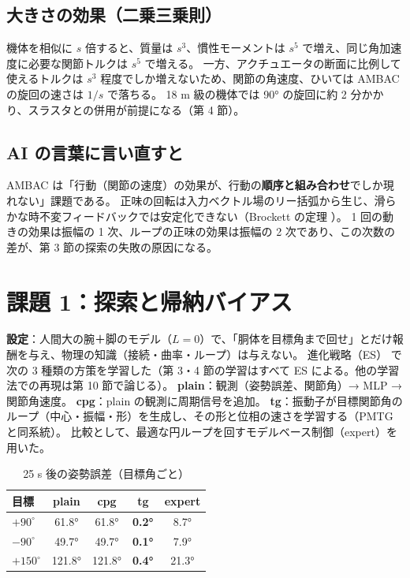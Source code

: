 \documentclass[paper=a4paper,fontsize=10pt,twocolumn,column_gap=2zw,line_length=24zw,number_of_lines=46,head_space=20mm]{jlreq}
\begin{document}
\subsection{大きさの効果（二乗三乗則）}
機体を相似に $s$ 倍すると、質量は $s^3$、慣性モーメントは $s^5$ で増え、同じ角加速度に必要な関節トルクは $s^5$ で増える。
一方、アクチュエータの断面に比例して使えるトルクは $s^3$ 程度でしか増えないため、関節の角速度、ひいては AMBAC の旋回の速さは $1/s$ で落ちる。
18 m 級の機体では 90° の旋回に約 2 分かかり、スラスタとの併用が前提になる（第 4 節）。

\subsection{AI の言葉に言い直すと}
AMBAC は「行動（関節の速度）の効果が、行動の\textbf{順序と組み合わせ}でしか現れない」課題である。
正味の回転は入力ベクトル場のリー括弧から生じ、滑らかな時不変フィードバックでは安定化できない（Brockett の定理 \cite{brockett1983}）。
1 回の動きの効果は振幅の 1 次、ループの正味の効果は振幅の 2 次であり、この次数の差が、第 3 節の探索の失敗の原因になる。


\section{課題 1：探索と帰納バイアス}

\textbf{設定}：人間大の腕＋脚のモデル（$L=0$）で、「胴体を目標角まで回せ」とだけ報酬を与え、物理の知識（接続・曲率・ループ）は与えない。
進化戦略（ES）\cite{salimans2017} で次の 3 種類の方策を学習した（第 3・4 節の学習はすべて ES による。他の学習法での再現は第 10 節で論じる）。
\textbf{plain}：観測（姿勢誤差、関節角）→ MLP → 関節角速度。
\textbf{cpg}：plain の観測に周期信号を追加。
\textbf{tg}：振動子が目標関節角のループ（中心・振幅・形）を生成し、その形と位相の速さを学習する（PMTG \cite{iscen2018} と同系統）。
比較として、最適な円ループを回すモデルベース制御（expert）を用いた。

\begin{table}[t]\centering\small
\caption{25 s 後の姿勢誤差（目標角ごと）}\label{tab:learn}
\begin{tabular}{lcccc}\toprule
目標 & plain & cpg & \textbf{tg} & expert \\\midrule
$+90^\circ$ & 61.8° & 61.8° & \textbf{0.2°} & 8.7° \\
$-90^\circ$ & 49.7° & 49.7° & \textbf{0.1°} & 7.9° \\
$+150^\circ$ & 121.8° & 121.8° & \textbf{0.4°} & 21.3° \\\bottomrule
\end{tabular}
\end{table}
\end{document}

